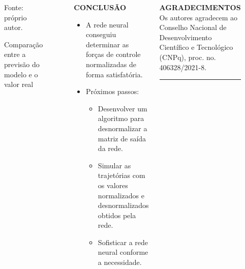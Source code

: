 \documentclass[serif,20pt]{beamer}
\begin{document}
\begin{frame}[t]
\begin{columns}[t]
\begin{block}{}
\begin{figure}[H]
    \centering
    \caption{Comparação entre a previsão do modelo e o valor real}

    {\footnotesize Fonte: próprio autor.}

    \label{fig:comparison}
\end{figure}
\end{block}

\begin{block}{\centering\bfseries CONCLUSÃO}
\vspace{1cm}
\begin{itemize}\justifying
    \item A rede neural conseguiu determinar as forças de controle normalizadas de forma satisfatória.
    \item Próximos passos:
    \begin{itemize}\justifying
        \item Desenvolver um algoritmo para desnormalizar a matriz de saída da rede.
        \item Simular as trajetórias com os valores normalizados e desnormalizados obtidos pela rede.
        \item Sofisticar a rede neural conforme a necessidade.
    \end{itemize}
\end{itemize}
\vspace{1cm}
\end{block}

\begin{block}{\centering\bfseries AGRADECIMENTOS}\justifying
\vspace{1cm}
Os autores agradecem ao Conselho Nacional de Desenvolvimento Científico e Tecnológico (CNPq), proc. no. 406328/2021-8.

\rule{10cm}{0.4pt}


{\small}
\end{block}


\end{columns}    
\end{frame}
\end{document}
